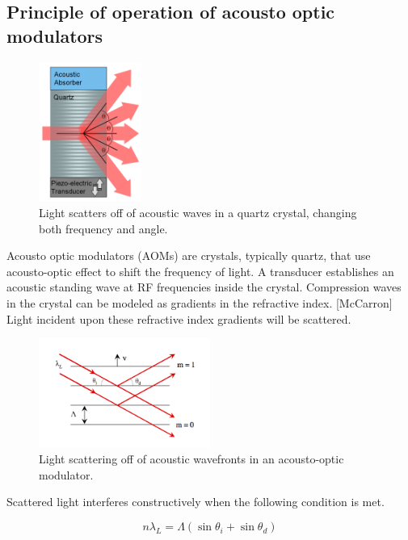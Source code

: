 \subsection{Principle of operation of acousto optic modulators}

\begin{figure}[h!]
\centering
\includegraphics[width=0.3\textwidth]{Images/Background/aom.png}
\caption{Light scatters off of acoustic waves in a quartz crystal, changing both frequency and angle.}
\end{figure}

Acousto optic modulators (AOMs) are crystals, typically quartz, that use acousto-optic effect to shift the frequency of light. A transducer establishes an acoustic standing wave at RF frequencies inside the crystal. Compression waves in the crystal can be modeled as gradients in the refractive index. [McCarron] Light incident upon these refractive index gradients will be scattered.

\begin{figure}[h!]
\centering
\includegraphics[width=0.5\textwidth]{Images/Background/aom_scattering.png}
\caption{Light scattering off of acoustic wavefronts in an acousto-optic modulator.}
\end{figure}

Scattered light interferes constructively when the following condition is met.

\begin{equation} \label{eq:constructive_interference}
n \lambda_L = \Lambda (\sin{\theta_i} + \sin{\theta_d})
\end{equation}

